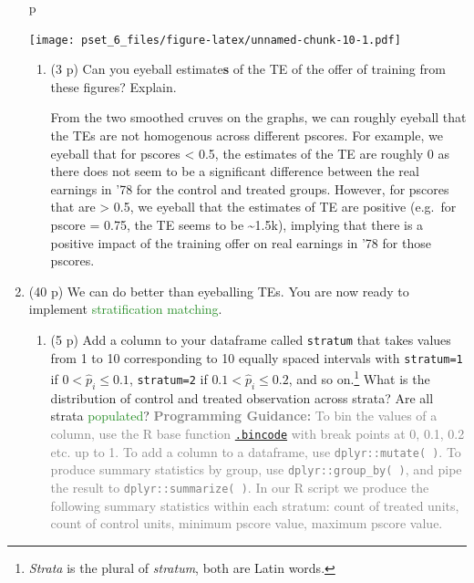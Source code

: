 \documentclass[
]{article}
\newenvironment{Shaded}{\begin{snugshade}}{\end{snugshade}}
\newcommand{\NormalTok}[1]{#1}
\providecommand{\tightlist}{%
  \setlength{\itemsep}{0pt}\setlength{\parskip}{0pt}}
\begin{document}
\begin{enumerate}
\begin{Shaded}
\begin{Highlighting}[]
\NormalTok{p}
\end{Highlighting}
\end{Shaded}

  \texttt{[image: pset\_6\_files/figure-latex/unnamed-chunk-10-1.pdf]}

  \begin{enumerate}
  \def\labelenumii{\alph{enumii}.}
  \setcounter{enumii}{1}
  \item
    (3 p) Can you eyeball estimate\textbf{s} of the TE of the offer of
    training from these figures? Explain.

    From the two smoothed cruves on the graphs, we can roughly eyeball
    that the TEs are not homogenous across different pscores. For
    example, we eyeball that for pscores \textless{} 0.5, the estimates
    of the TE are roughly 0 as there does not seem to be a significant
    difference between the real earnings in '78 for the control and
    treated groups. However, for pscores that are \textgreater{} 0.5, we
    eyeball that the estimates of TE are positive (e.g.~for pscore =
    0.75, the TE seems to be \textasciitilde1.5k), implying that there
    is a positive impact of the training offer on real earnings in '78
    for those pscores.
  \end{enumerate}
\item
  (40 p) We can do better than eyeballing TEs. You are now ready to
  implement \textcolor{ForestGreen}{stratification matching}.

  \begin{enumerate}
  \def\labelenumii{\alph{enumii}.}
  \tightlist
  \item
    (5 p) Add a column to your dataframe called \texttt{stratum} that
    takes values from 1 to 10 corresponding to 10 equally spaced
    intervals with \texttt{stratum=1} if \(0<\widehat{p}_{i}\leq 0.1\),
    \texttt{stratum=2} if \(0.1<\widehat{p}_{i}\leq 0.2\), and so
    on.\footnote{\textit{Strata} is the plural of \textit{stratum}, both are Latin words.}
    What is the distribution of control and treated observation across
    strata? Are all strata \textcolor{ForestGreen}{populated}?
    \textcolor{gray}{\textbf{Programming Guidance:} To bin the values of a column, use the R base function \href{https://www.rdocumentation.org/packages/base/versions/3.6.2/topics/.bincode( )}{\texttt{.bincode}} with break points at 0, 0.1, 0.2 etc. up to 1. To add a column to a dataframe, use \texttt{dplyr::mutate( )}. To produce summary statistics by group, use \texttt{dplyr::group\_by( )}, and pipe the result to \texttt{dplyr::summarize( )}. In our R script we produce the following summary statistics within each stratum: count of treated units, count of control units, minimum pscore value, maximum pscore value.}
  \end{enumerate}


\end{enumerate}
\end{document}
